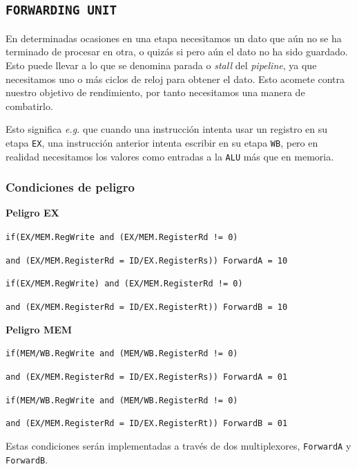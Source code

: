 \documentclass[a4paper]{article}
\begin{document}
\subsection{\texttt{FORWARDING UNIT}} \label{sec:fu}
En determinadas ocasiones en una etapa necesitamos un dato que aún no se ha terminado de procesar en otra, o quizás si pero aún el dato no ha sido guardado. Esto puede llevar a lo que se denomina parada o \textit{stall} del \textit{pipeline}, ya que necesitamos uno o más ciclos de reloj para obtener el dato. Esto acomete contra nuestro objetivo de rendimiento, por tanto necesitamos una manera de combatirlo.

Esto significa \textit{e.g.} que cuando una instrucción intenta usar un registro en su etapa \texttt{EX}, una instrucción anterior intenta escribir en su etapa \texttt{WB}, pero en realidad necesitamos los valores como entradas a la \texttt{ALU} más que en memoria.

\subsubsection{Condiciones de peligro}

\textbf{Peligro EX}

\texttt{if(EX/MEM.RegWrite and (EX/MEM.RegisterRd != 0)}

\texttt{and (EX/MEM.RegisterRd = ID/EX.RegisterRs)) ForwardA = 10}

\texttt{if(EX/MEM.RegWrite) and (EX/MEM.RegisterRd != 0)}

\texttt{and (EX/MEM.RegisterRd = ID/EX.RegisterRt)) ForwardB = 10}

\medskip

\textbf{Peligro MEM}

\texttt{if(MEM/WB.RegWrite and (MEM/WB.RegisterRd != 0)}

\texttt{and (EX/MEM.RegisterRd = ID/EX.RegisterRs)) ForwardA = 01}

\texttt{if(MEM/WB.RegWrite and (MEM/WB.RegisterRd != 0)}

\texttt{and (EX/MEM.RegisterRd = ID/EX.RegisterRt)) ForwardB = 01}

\bigskip

Estas condiciones serán implementadas a través de dos multiplexores, \texttt{ForwardA} y \texttt{ForwardB}.
\end{document}
